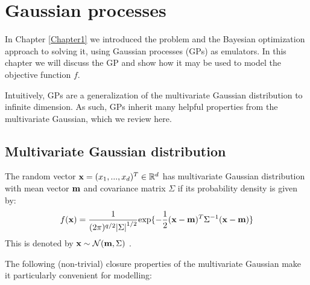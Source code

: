 
\chapter{Gaussian processes} %

\label{Chapter2} %


In Chapter \ref{Chapter1} we introduced the problem and the Bayesian optimization approach to solving it, using Gaussian processes (GPs) as emulators. In this chapter we will discuss the GP and show how it may be used to model the objective function $f$.

Intuitively, GPs are a generalization of the multivariate Gaussian distribution to infinite dimension. As such, GPs inherit many helpful properties from the multivariate Gaussian, which we review here. 

\section{Multivariate Gaussian distribution}

The random vector $\mathbf{x} = (x_1,...,x_d)^T \in \mathbb{R}^d$ has multivariate Gaussian distribution with mean vector $\mathbf{m}$ and covariance matrix $\Sigma$ if its probability density is given by:
%
\begin{equation} \label{eq:gaussian}
f(\mathbf{x}) = \frac{1}{(2\pi)^{q/2}{\left | \Sigma  \right |}^{1/2}} \textrm{exp}\{{-\frac{1}{2}(\mathbf{x}-\mathbf{m})^T \Sigma^{-1} (\mathbf{x}-\mathbf{m})}\}
\end{equation}
%
This is denoted by $\mathbf{x} \sim \mathcal{N}(\mathbf{m}, \Sigma)$ \cite{sm3}. 

The following (non-trivial) closure properties \citep{krzanowski} of the multivariate Gaussian make it particularly convenient for modelling:


